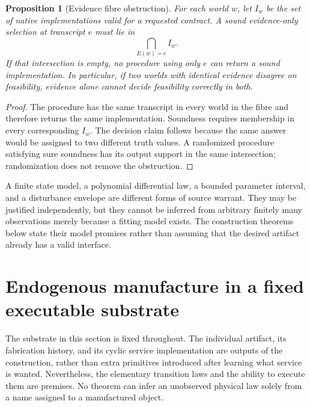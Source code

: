 \documentclass[11pt]{article}
\newtheorem{proposition}[theorem]{Proposition}
\theoremstyle{definition}
\theoremstyle{remark}
\begin{document}
\begin{proposition}[Evidence fibre obstruction]\label{prop:fibre}
For each world $w$, let $I_w$ be the set of native implementations valid
for a requested contract. A sound evidence-only selection at transcript
$e$ must lie in
\[
                    \bigcap_{E(w)=e}I_w.
\]
If that intersection is empty, no procedure using only $e$ can return a
sound implementation. In particular, if two worlds with identical
evidence disagree on feasibility, evidence alone cannot decide
feasibility correctly in both.
\end{proposition}
\begin{proof}
The procedure has the same transcript in every world in the fibre and
therefore returns the same implementation. Soundness requires membership
in every corresponding $I_w$. The decision claim follows because the
same answer would be assigned to two different truth values. A randomized
procedure satisfying sure soundness has its output support in the same
intersection; randomization does not remove the obstruction.
\end{proof}

A finite state model, a polynomial differential law, a bounded parameter
interval, and a disturbance envelope are different forms of source
warrant. They may be justified independently, but they cannot be inferred
from arbitrary finitely many observations merely because a fitting model
exists. The construction theorems below state their model promises rather
than assuming that the desired artifact already has a valid interface.


\section{Endogenous manufacture in a fixed executable substrate}

The substrate in this section is fixed throughout. The individual artifact, its fabrication history, and its cyclic service implementation are outputs of the construction, rather than extra primitives introduced after learning what service is wanted. Nevertheless, the elementary transition laws and the ability to execute them are premises. No theorem can infer an unobserved physical law solely from a name assigned to a manufactured object.
\end{document}
